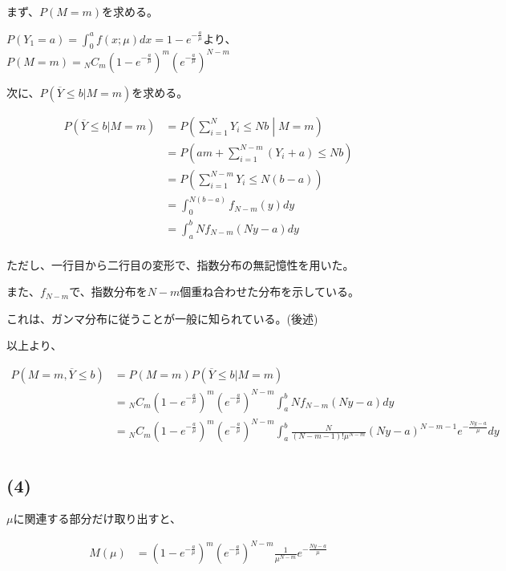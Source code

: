 \documentclass[a4paper, 10pt, dvipdfmx]{jlreq}
\begin{document}
まず、$P(M=m)$を求める。

$P(Y_1=a)=\int_0^a{f(x;\mu)}dx=1-e^{-\frac{a}{\mu}}$より、$P(M=m) = {}_NC_m (1-e^{-\frac{a}{\mu}})^m(e^{-\frac{a}{\mu}})^{N-m}$

次に、$P(\overline{Y}\leq b | M=m)$を求める。

\begin{align*}
  P(\overline{Y}\leq b | M=m) & = P\left( \sum_{i=1}^N Y_i \leq Nb \middle| M=m \right)  \\
                              & = P\left( am + \sum_{i=1}^{N-m} (Y_i+a)  \leq Nb \right) \\
                              & = P\left( \sum_{i=1}^{N-m} Y_i  \leq N(b-a) \right)      \\
                              & = \int_0^{N(b-a)} f_{N-m}(y) dy                          \\
                              & = \int_a^{b} Nf_{N-m}(Ny-a) dy                           \\
\end{align*}

ただし、一行目から二行目の変形で、指数分布の無記憶性を用いた。

また、$f_{N-m}$で、指数分布を$N-m$個重ね合わせた分布を示している。

これは、ガンマ分布に従うことが一般に知られている。(後述)

以上より、

\begin{align*}
  P(M=m,\overline{Y}\leq b) & = P(M=m)P(\overline{Y} \leq b|M=m)                                                                                                          \\
                            & = {}_NC_m (1-e^{-\frac{a}{\mu}})^m(e^{-\frac{a}{\mu}})^{N-m} \int_a^{b} N f_{N-m}(Ny-a) dy                                                  \\
                            & = {}_NC_m (1-e^{-\frac{a}{\mu}})^m(e^{-\frac{a}{\mu}})^{N-m} \int_a^{b} \frac{N}{(N-m-1)!\mu^{N-m}} (Ny-a)^{N-m-1} e^{-\frac{Ny-a}{\mu}} dy \\
\end{align*}

\subsection*{(4)}

$\mu$に関連する部分だけ取り出すと、

\begin{align*}
  M(\mu) & = (1-e^{-\frac{a}{\mu}})^m(e^{-\frac{a}{\mu}})^{N-m}  \frac{1}{\mu^{N-m}} e^{-\frac{Ny-a}{\mu}}
\end{align*}
\end{document}
